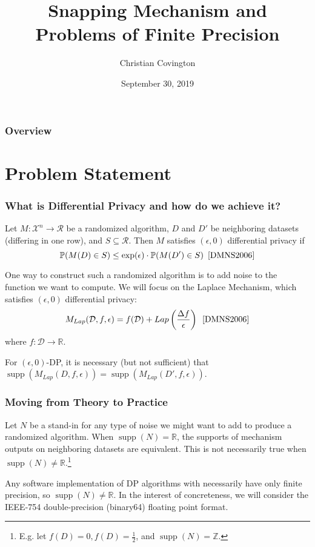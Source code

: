 \documentclass{beamer}
\title{Snapping Mechanism and Problems of Finite Precision}
\author{Christian Covington}
\institute{Harvard University Privacy Tools Project}
\date{September 30, 2019}
\DeclareMathOperator\supp{supp}
\begin{document}
\frame{\titlepage}

\begin{frame}
    \frametitle{Overview}
    \tableofcontents
\end{frame}

\section{Problem Statement}

\begin{frame}
    \frametitle{What is Differential Privacy and how do we achieve it?}
    Let $M : \mathcal{X}^{n} \rightarrow \mathcal{R}$ be a randomized algorithm, $D$ and $D'$ be neighboring datasets (differing in one row), and $S \subseteq \mathcal{R}$. Then $M$ satisfies $(\epsilon, 0)$ differential privacy if
    \[ \mathbb{P}(M(D) \in S) \leq \exp(\epsilon) \cdot \mathbb{P}(M(D') \in S) \hspace{5pt} \cite{DMNS2006} \]

    One way to construct such a randomized algorithm is to add noise to the function we want to compute. We will focus on the Laplace Mechanism, which satisfies $(\epsilon, 0)$ differential privacy:
    \[ M_{Lap}(\mathcal{D}, f, \epsilon) = f(\mathcal{D}) + Lap \left(\frac{\Delta f}{\epsilon} \right) \hspace{5pt} \cite{DMNS2006} \]
    where $f: \mathcal{D} \rightarrow \mathbb{R}$.

    For $(\epsilon, 0)$-DP, it is necessary (but not sufficient) that $\supp\left( M_{Lap}(D, f, \epsilon) \right) = \supp\left( M_{Lap}(D', f, \epsilon) \right)$.
\end{frame}

\begin{frame}
    \frametitle{Moving from Theory to Practice}
    Let $N$ be a stand-in for any type of noise we might want to add to produce a randomized algorithm. When $\supp(N) = \mathbb{R}$, the supports of mechanism outputs on neighboring datasets are equivalent. This is not necessarily true when $\supp(N) \neq \mathbb{R}$.\footnote{E.g. let $f(D) = 0, f(D) = \frac{1}{2}$, and $\supp(N) = \mathbb{Z}$.}

    Any software implementation of DP algorithms with necessarily have only finite precision, so $\supp(N) \neq \mathbb{R}$.
    In the interest of concreteness, we will consider the IEEE-754 double-precision (binary64) floating point format.
\end{frame}
\end{document}
